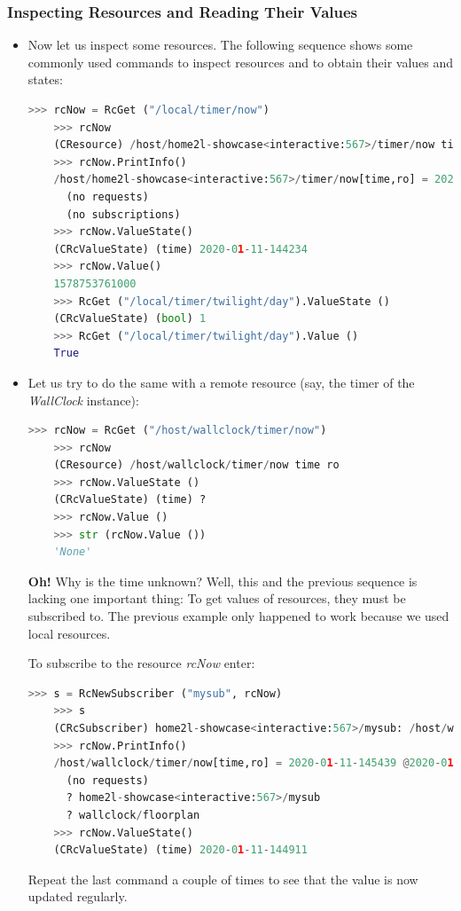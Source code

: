 \documentclass[12pt,english,parskip=half,headheight=19pt]{scrreprt}
\begin{document}
\subsubsection*{Inspecting Resources and Reading Their Values}

\begin{itemize}[$\blacktriangleright$]

\item
  Now let us inspect some resources. The following sequence shows some commonly used commands to inspect
  resources and to obtain their values and states:
  \begin{lstlisting}[language=python]
    >>> rcNow = RcGet ("/local/timer/now")
    >>> rcNow
    (CResource) /host/home2l-showcase<interactive:567>/timer/now time ro
    >>> rcNow.PrintInfo()
    /host/home2l-showcase<interactive:567>/timer/now[time,ro] = 2020-01-11-150350 @2020-01-11-150350.000
      (no requests)
      (no subscriptions)
    >>> rcNow.ValueState()
    (CRcValueState) (time) 2020-01-11-144234
    >>> rcNow.Value()
    1578753761000
    >>> RcGet ("/local/timer/twilight/day").ValueState ()
    (CRcValueState) (bool) 1
    >>> RcGet ("/local/timer/twilight/day").Value ()
    True
  \end{lstlisting}

\item
  Let us try to do the same with a remote resource (say, the timer of the \textit{WallClock} instance):
  \begin{lstlisting}[language=python]
    >>> rcNow = RcGet ("/host/wallclock/timer/now")
    >>> rcNow
    (CResource) /host/wallclock/timer/now time ro
    >>> rcNow.ValueState ()
    (CRcValueState) (time) ?
    >>> rcNow.Value ()
    >>> str (rcNow.Value ())
    'None'
  \end{lstlisting}
  \textbf{Oh!} Why is the time unknown? Well, this and the previous sequence is lacking
  one important thing: To get values of resources, they must be subscribed to.
  The previous example only happened to work because we used local resources.

  To subscribe to the resource \textit{rcNow} enter:
  \begin{lstlisting}[language=python]
    >>> s = RcNewSubscriber ("mysub", rcNow)
    >>> s
    (CRcSubscriber) home2l-showcase<interactive:567>/mysub: /host/wallclock/timer/now
    >>> rcNow.PrintInfo()
    /host/wallclock/timer/now[time,ro] = 2020-01-11-145439 @2020-01-11-145439.007
      (no requests)
      ? home2l-showcase<interactive:567>/mysub
      ? wallclock/floorplan
    >>> rcNow.ValueState()
    (CRcValueState) (time) 2020-01-11-144911
  \end{lstlisting}
  Repeat the last command a couple of times to see that the value is now updated regularly.

\end{itemize}
\end{document}

